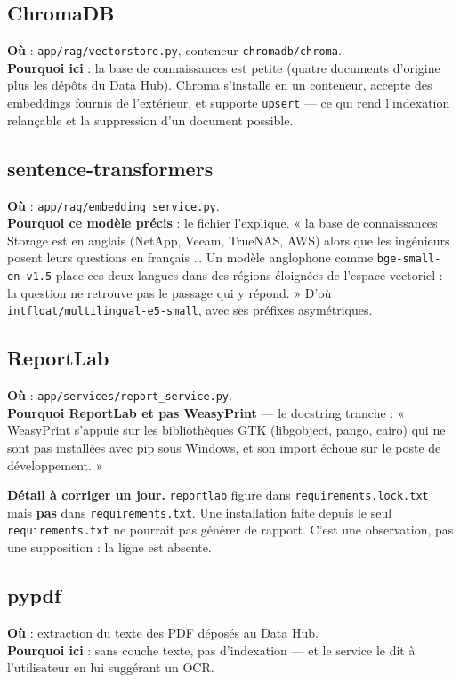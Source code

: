\documentclass[11pt,a4paper]{report}
\newcommand{\file}[1]{\texttt{\small #1}}
\begin{document}
\subsection{ChromaDB}
\textbf{Où} : \file{app/rag/vectorstore.py}, conteneur \texttt{chromadb/chroma}.\\
\textbf{Pourquoi ici} : la base de connaissances est petite (quatre documents
d'origine plus les dépôts du Data Hub). Chroma s'installe en un conteneur,
accepte des embeddings fournis de l'extérieur, et supporte \texttt{upsert} ---
ce qui rend l'indexation relançable et la suppression d'un document possible.

\subsection{sentence-transformers}
\textbf{Où} : \file{app/rag/embedding\_service.py}.\\
\textbf{Pourquoi ce modèle précis} : le fichier l'explique. « la base de
connaissances Storage est en anglais (NetApp, Veeam, TrueNAS, AWS) alors que les
ingénieurs posent leurs questions en français \ldots{} Un modèle anglophone comme
\texttt{bge-small-en-v1.5} place ces deux langues dans des régions éloignées de
l'espace vectoriel : la question ne retrouve pas le passage qui y répond. »
D'où \texttt{intfloat/multilingual-e5-small}, avec ses préfixes asymétriques.

\subsection{ReportLab}
\textbf{Où} : \file{app/services/report\_service.py}.\\
\textbf{Pourquoi ReportLab et pas WeasyPrint} --- le docstring tranche :
« WeasyPrint s'appuie sur les bibliothèques GTK (libgobject, pango, cairo) qui
ne sont pas installées avec pip sous Windows, et son import échoue sur le poste
de développement. »

\begin{warnbox}
\textbf{Détail à corriger un jour.} \texttt{reportlab} figure dans
\file{requirements.lock.txt} mais \textbf{pas} dans \file{requirements.txt}.
Une installation faite depuis le seul \file{requirements.txt} ne pourrait pas
générer de rapport. C'est une observation, pas une supposition : la ligne est
absente.
\end{warnbox}

\subsection{pypdf}
\textbf{Où} : extraction du texte des PDF déposés au Data Hub.\\
\textbf{Pourquoi ici} : sans couche texte, pas d'indexation --- et le service le
dit à l'utilisateur en lui suggérant un OCR.
\end{document}
